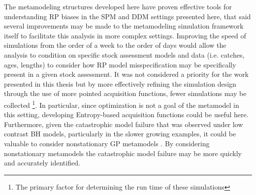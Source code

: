 \documentclass[12pt]{ucscthesis}
\begin{document}
%
The metamodeling structures developed here have proven effective tools for understanding RP biases 
in the SPM and DDM settings presented here, that said several improvements may be made to the metamodeling 
simulation framework itself to facilitate this analysis in more complex settings. Improving the speed 
of simulations from the order of a week to the order of days would allow the analysis to condition 
on specific stock assessment models and data (i.e. catches, ages, lengths) to consider how RP model 
misspecification may be specifically present in a given stock assessment. It was not considered a priority 
for the work presented in this thesis but by more effectively refining the simulation design through the 
use of more pointed acquisition functions\cite{pourmohamad_bayesian_2021}, fewer simulations may be collected 
\footnote{The primary factor for determining the run time of these simulations}. In particular, since 
optimization is not a goal of the metamodel in this setting, developing Entropy-based acquisition functions 
\cite{hennig_entropy_2012, hernandez-lobato_predictive_2014} could be useful here. Furthermore, given the 
catastrophic model failure that was observed under low contrast BH models, particularly in the slower 
growing examples, it could be valuable to consider nonstationary GP metamodels \cite{gramacy_bayesian_2008, binois_hetgp_2021}. %
By considering nonstationary metamodels the catastrophic model failure may be more quickly and accurately 
identified.


\end{document}

